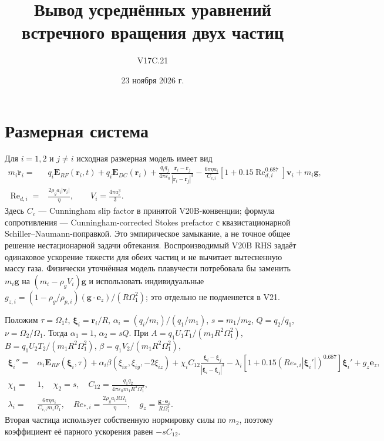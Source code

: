 \documentclass[11pt]{article}
\title{Вывод усреднённых уравнений встречного вращения двух частиц}
\author{V17C.21}
\date{23 ноября 2026 г.}
\begin{document}
\maketitle

\section{Размерная система}
Для $i=1,2$ и $j\ne i$ исходная размерная модель имеет вид
\begin{align}
 m_i\ddot{\bm r}_i={}&q_i\bm E_{RF}(\bm r_i,t)
 +q_i\bm E_{DC}(\bm r_i)
 +\frac{q_iq_j}{4\pi\varepsilon_0}
 \frac{\bm r_i-\bm r_j}{|\bm r_i-\bm r_j|^3}
 -\frac{6\pi\eta a_i}{C_{c,i}}
 \left[1+0.15\operatorname{Re}_{d,i}^{0.687}\right]
 \bm v_i +m_i\bm g,\\
 \operatorname{Re}_{d,i}={}&\frac{2\rho_g a_i|\bm v_i|}{\eta},
 \qquad V_i=\frac{4\pi a_i^3}{3}.
\end{align}
Здесь $C_c$ — Cunningham slip factor в принятой V20B-конвенции; формула сопротивления — Cunningham-corrected Stokes prefactor с квазистационарной Schiller--Naumann-поправкой. Это эмпирическое замыкание, а не точное общее решение нестационарной задачи обтекания. Воспроизводимый V20B RHS задаёт одинаковое ускорение тяжести для обеих частиц и не вычитает вытесненную массу газа. Физически уточнённая модель плавучести потребовала бы заменить $m_i\bm g$ на $(m_i-\rho_gV_i)\bm g$ и использовать индивидуальные $g_{z,i}=(1-\rho_g/\rho_{p,i})(\bm g\cdot\bm e_z)/(R\Omega_1^2)$; это отдельно не подменяется в V21.

Положим $\tau=\Omega_1t$, $\bm\xi_i=\bm r_i/R$, $\alpha_i=(q_i/m_i)/(q_1/m_1)$, $s=m_1/m_2$, $Q=q_2/q_1$, $\nu=\Omega_2/\Omega_1$. Тогда $\alpha_1=1$, $\alpha_2=sQ$. При $A=q_1U_1T_1/(m_1R^2\Omega_1^2)$, $B=q_1U_2T_2/(m_1R^2\Omega_1^2)$, $\beta=q_1V_2/(m_1R^2\Omega_1^2)$,
\begin{align}
 \bm\xi_i''={}&\alpha_i\bm E_{RF}(\bm\xi_i,\tau)
 +\alpha_i\beta(\xi_{ix},\xi_{iy},-2\xi_{iz})
 +\chi_iC_{12}\frac{\bm\xi_i-\bm\xi_j}{|\bm\xi_i-\bm\xi_j|^3}
 -\lambda_i[1+0.15(Re_{*,i}|\bm\xi_i'|)^{0.687}]\bm\xi_i'
 +g_z\bm e_z,\\
 \chi_1={}&1,\quad \chi_2=s,\quad
 C_{12}=\frac{q_1q_2}{4\pi\varepsilon_0m_1R^3\Omega_1^2},\\
 \lambda_i={}&\frac{6\pi\eta a_i}{C_{c,i}m_i\Omega_1},\quad
 Re_{*,i}=\frac{2\rho_ga_iR\Omega_1}{\eta},\quad
 g_z=\frac{\bm g\cdot\bm e_z}{R\Omega_1^2}.
\end{align}
Вторая частица использует собственную нормировку силы по $m_2$, поэтому коэффициент её парного ускорения равен $-sC_{12}$.
\end{document}
